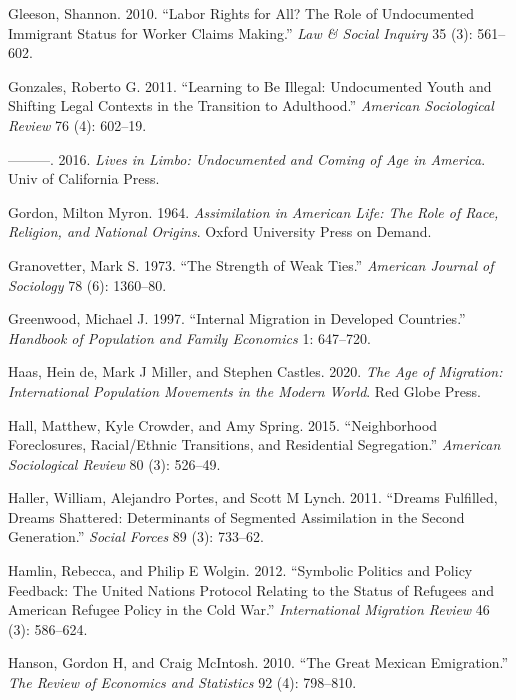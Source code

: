 \documentclass[
]{article}
\begin{document}
\leavevmode\hypertarget{ref-gleeson2010labor}{}%
Gleeson, Shannon. 2010. ``Labor Rights for All? The Role of Undocumented
Immigrant Status for Worker Claims Making.'' \emph{Law \& Social
Inquiry} 35 (3): 561--602.

\leavevmode\hypertarget{ref-gonzales2011learning}{}%
Gonzales, Roberto G. 2011. ``Learning to Be Illegal: Undocumented Youth
and Shifting Legal Contexts in the Transition to Adulthood.''
\emph{American Sociological Review} 76 (4): 602--19.

\leavevmode\hypertarget{ref-gonzales2016lives}{}%
---------. 2016. \emph{Lives in Limbo: Undocumented and Coming of Age in
America}. Univ of California Press.

\leavevmode\hypertarget{ref-gordon1964assimilation}{}%
Gordon, Milton Myron. 1964. \emph{Assimilation in American Life: The
Role of Race, Religion, and National Origins}. Oxford University Press
on Demand.

\leavevmode\hypertarget{ref-granovetter1973}{}%
Granovetter, Mark S. 1973. ``The Strength of Weak Ties.'' \emph{American
Journal of Sociology} 78 (6): 1360--80.

\leavevmode\hypertarget{ref-greenwood1997internal}{}%
Greenwood, Michael J. 1997. ``Internal Migration in Developed
Countries.'' \emph{Handbook of Population and Family Economics} 1:
647--720.

\leavevmode\hypertarget{ref-de2020age}{}%
Haas, Hein de, Mark J Miller, and Stephen Castles. 2020. \emph{The Age
of Migration: International Population Movements in the Modern World}.
Red Globe Press.

\leavevmode\hypertarget{ref-hall2015neighborhood}{}%
Hall, Matthew, Kyle Crowder, and Amy Spring. 2015. ``Neighborhood
Foreclosures, Racial/Ethnic Transitions, and Residential Segregation.''
\emph{American Sociological Review} 80 (3): 526--49.

\leavevmode\hypertarget{ref-haller2011dreams}{}%
Haller, William, Alejandro Portes, and Scott M Lynch. 2011. ``Dreams
Fulfilled, Dreams Shattered: Determinants of Segmented Assimilation in
the Second Generation.'' \emph{Social Forces} 89 (3): 733--62.

\leavevmode\hypertarget{ref-hamlin2012symbolic}{}%
Hamlin, Rebecca, and Philip E Wolgin. 2012. ``Symbolic Politics and
Policy Feedback: The United Nations Protocol Relating to the Status of
Refugees and American Refugee Policy in the Cold War.''
\emph{International Migration Review} 46 (3): 586--624.

\leavevmode\hypertarget{ref-hanson2010great}{}%
Hanson, Gordon H, and Craig McIntosh. 2010. ``The Great Mexican
Emigration.'' \emph{The Review of Economics and Statistics} 92 (4):
798--810.
\end{document}
